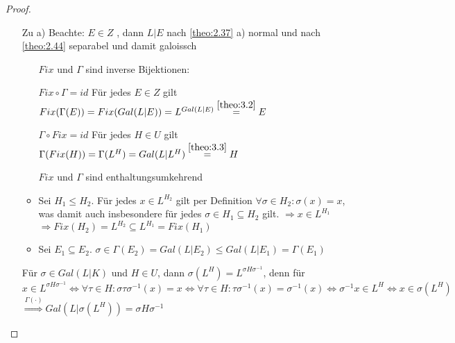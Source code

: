 \documentclass[../main.tex]{subfiles}
\begin{document}
\begin{proof} $ $
\begin{itemize}[align= left]
    \item[Zu a)]
    Beachte: $E\in Z$ , dann $L|E$ nach \cref{theo:2.37} a) normal und nach \cref{theo:2.44} separabel und damit galoissch
    
    \begin{itemize}[align=left]
        \item[]$Fix$ und $\Gamma$ sind inverse Bijektionen:
        \item[$Fix\circ \Gamma = id$] Für jedes $E\in Z$ gilt $Fix(\Gamma(E))=Fix(Gal(L|E)) = L^{Gal(L|E)}\overset{\ref{theo:3.2}}{=} E$
        \item[$\Gamma\circ Fix = id$] Für jedes $H\in U$ gilt $\Gamma(Fix(H)) = \Gamma(L^H) = Gal(L|L^H)\overset{\ref{theo:3.3}}{=}H$
    \end{itemize}
    
    \begin{itemize}[label=•,align=left]
        \item[$Fix$ und $\Gamma$ sind enthaltungsumkehrend] 
        \item Sei $H_1\leq H_2$.
        Für jedes $x\in L^{H_2}$  gilt per Definition $\forall\sigma\in H_2\colon \sigma(x)=x$, was damit auch insbesondere für jedes $\sigma\in H_1\subseteq H_2$ gilt. $\Rightarrow x\in L^{H_1}$\\
        $\Rightarrow Fix(H_2) = L^{H_2}\subseteq L^{H_1} = Fix(H_1)$
        \item 
        Sei $E_1\subseteq E_2$.
        $\sigma \in \Gamma(E_2) = Gal(L|E_2)\leq Gal(L|E_1)=\Gamma(E_1)$ 
    \end{itemize}

    
    \begin{remark*}
        Für $\sigma\in Gal(L|K)$ und $H\in U$, dann $\sigma(L^H) = L^{\sigma H \sigma^{-1}}$, denn für $x\in L^{\sigma H \sigma^{-1}} \Leftrightarrow \forall \tau \in H\colon \sigma \tau \sigma^{-1}(x)=x \Leftrightarrow \forall \tau \in H\colon \tau \sigma^{-1}(x) = \sigma^{-1}(x) \Leftrightarrow \sigma^{-1}x\in L^H \Leftrightarrow x\in \sigma(L^H)$\\
        $\overset{\Gamma(\cdot)}{\Longrightarrow} Gal(L|\sigma(L^H)) = \sigma H \sigma^{-1}$
    \end{remark*}


\end{itemize}
\end{proof}
\end{document}
